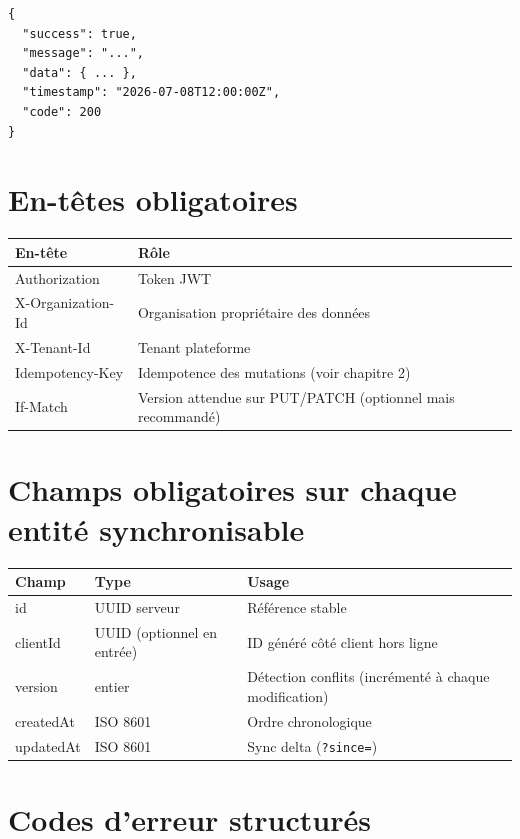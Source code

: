 \documentclass[12pt,a4paper]{report}
\begin{document}
\begin{verbatim}
{
  "success": true,
  "message": "...",
  "data": { ... },
  "timestamp": "2026-07-08T12:00:00Z",
  "code": 200
}
\end{verbatim}

\section{En-têtes obligatoires}

\begin{longtable}{@{}p{4cm}p{8.5cm}@{}}
\hline
\textbf{En-tête} & \textbf{Rôle} \\
\hline
\endhead
Authorization & Token JWT \\
\hline
X-Organization-Id & Organisation propriétaire des données \\
\hline
X-Tenant-Id & Tenant plateforme \\
\hline
Idempotency-Key & Idempotence des mutations (voir chapitre 2) \\
\hline
If-Match & Version attendue sur PUT/PATCH (optionnel mais recommandé) \\
\hline
\end{longtable}

\section{Champs obligatoires sur chaque entité synchronisable}

\begin{longtable}{@{}p{3cm}p{4cm}p{6cm}@{}}
\hline
\textbf{Champ} & \textbf{Type} & \textbf{Usage} \\
\hline
\endhead
id & UUID serveur & Référence stable \\
\hline
clientId & UUID (optionnel en entrée) & ID généré côté client hors ligne \\
\hline
version & entier & Détection conflits (incrémenté à chaque modification) \\
\hline
createdAt & ISO 8601 & Ordre chronologique \\
\hline
updatedAt & ISO 8601 & Sync delta (\texttt{?since=}) \\
\hline
\end{longtable}

\section{Codes d'erreur structurés}
\end{document}
